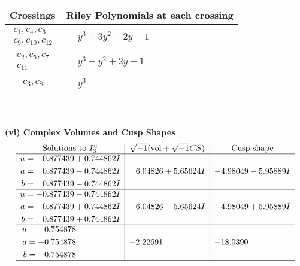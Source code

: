 \documentclass[1p]{elsarticle_modified}
\theoremstyle{definition}
\newcommand{\I}{\sqrt{-1}}
\begin{document}
\begin{tabular}{m{50pt}|m{274pt}}
Crossings & \hspace{64pt}Riley Polynomials at each crossing \\
\hline $$\begin{aligned}c_{1},c_{4},c_{6}\\c_{9},c_{10},c_{12}\end{aligned}$$&$\begin{aligned}
&y^3+3 y^2+2 y-1
\end{aligned}$\\
\hline $$\begin{aligned}c_{2},c_{5},c_{7}\\c_{11}\end{aligned}$$&$\begin{aligned}
&y^3- y^2+2 y-1
\end{aligned}$\\
\hline $$\begin{aligned}c_{3},c_{8}\end{aligned}$$&$\begin{aligned}
&y^3
\end{aligned}$\\
\hline
\end{tabular}\\~\\
\newpage\flushleft \textbf{(vi) Complex Volumes and Cusp Shapes}
$$\begin{array}{c|c|c}  
\text{Solutions to }I^u_{3}& \I (\text{vol} + \sqrt{-1}CS) & \text{Cusp shape}\\
 \hline 
\begin{aligned}
u &= -0.877439 + 0.744862 I \\
a &= \phantom{-}0.877439 - 0.744862 I \\
b &= \phantom{-}0.877439 - 0.744862 I\end{aligned}
 & \phantom{-}6.04826 + 5.65624 I & -4.98049 - 5.95889 I \\ \hline\begin{aligned}
u &= -0.877439 - 0.744862 I \\
a &= \phantom{-}0.877439 + 0.744862 I \\
b &= \phantom{-}0.877439 + 0.744862 I\end{aligned}
 & \phantom{-}6.04826 - 5.65624 I & -4.98049 + 5.95889 I \\ \hline\begin{aligned}
u &= \phantom{-}0.754878\phantom{ +0.000000I} \\
a &= -0.754878\phantom{ +0.000000I} \\
b &= -0.754878\phantom{ +0.000000I}\end{aligned}
 & -2.22691\phantom{ +0.000000I} & -18.0390\phantom{ +0.000000I}\\
 \hline 
 \end{array}$$\newpage\newpage\renewcommand{\arraystretch}{1}
\end{document}
